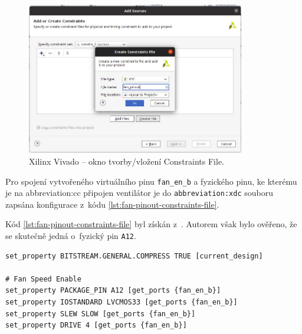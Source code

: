 \documentclass[a4paper, twoside, 11pt]{article}
\begin{document}
				\begin{figure}[htbp!]
					\centering
					\includegraphics[width=0.85\textwidth]{src/png/kr26-xilinx-vivado-flow/kr26-xilix-vivado-flow-32.jpg}
					\caption{Xilinx Vivado – okno tvorby/vložení Constraints File.}
					\label{fig:kr26-xilix-vivado-flow-32}
				\end{figure}

				Pro spojení vytvořeného virtuálního pinu \texttt{fan\_en\_b} a fyzického pinu, ke kterému je na \gls{abbreviation:cc} připojen ventilátor je do \texttt{\gls{abbreviation:xdc}} souboru zapsána konfigurace z~kódu \ref{lst:fan-pinout-constraints-file}.\par
				Kód \ref{lst:fan-pinout-constraints-file} byl získán z~\cite{hackster-add-peripherial-support-to-kria-kr260-vivado}. Autorem však bylo ověřeno, že se skutečně jedná o~fyzický pin \texttt{A12}.\par
				
				


				\begin{lstlisting}[language={xdc}, caption={Constraints XDC soubor pro přiřazení PL Vivado pinu fan\_en\_b k~fyzickému pinu MPSoC na CC.}, label= {lst:fan-pinout-constraints-file}]
set_property BITSTREAM.GENERAL.COMPRESS TRUE [current_design]
					
# Fan Speed Enable
set_property PACKAGE_PIN A12 [get_ports {fan_en_b}]
set_property IOSTANDARD LVCMOS33 [get_ports {fan_en_b}]
set_property SLEW SLOW [get_ports {fan_en_b}]
set_property DRIVE 4 [get_ports {fan_en_b}]\end{lstlisting}
\end{document}
